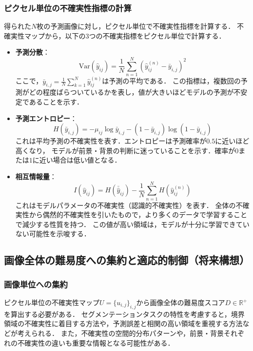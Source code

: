 \documentclass[10pt, a4paper, twocolumn]{jarticle}
\begin{document}
\subsubsection{ピクセル単位の不確実性指標の計算}
得られた$N$枚の予測画像に対し，ピクセル単位で不確実性指標を計算する．
不確実性マップから，以下の3つの不確実指標をピクセル単位で計算する．

\begin{itemize}
  \item \textbf{予測分散}：
  \begin{equation}
    \text{Var}(\hat{y}_{ij}) = \frac{1}{N} \sum_{n=1}^{N} (\hat{y}_{ij}^{(n)} - \bar{y}_{i,j})^2
  \end{equation}
  ここで，$\bar{y}_{i,j} = \frac{1}{N} \sum_{k = 1}^{N} \hat{y}_{ij} ^ {(n)}$は予測の平均である．
  この指標は，複数回の予測がどの程度ばらついているかを表し，値が大きいほどモデルの予測が不安定であることを示す．
  \item \textbf{予測エントロピー}：
  \begin{equation}
    H(\bar{y}_{i,j}) = - \mu_{ij} \log{\bar{y}_{i,j}} - (1 - \bar{y}_{i,j}) \log{(1 - \bar{y}_{i,j})}
  \end{equation}
  これは平均予測の不確実性を表す．エントロピーは予測確率が$0.5$に近いほど高くなり，
  モデルが前景・背景の判断に迷っていることを示す．確率が$0$または$1$に近い場合は低い値となる．
  \item \textbf{相互情報量}：
  \begin{equation}
    I(\hat{y}_{ij}) = H(\bar{\hat{y}}_{ij}) - \frac{1}{N}\sum_{n=1}^{N} H(\hat{y}_{ij}^{(n)})
  \end{equation}
  これはモデルパラメータの不確実性（認識的不確実性）を表す．
  全体の不確実性から偶然的不確実性を引いたもので，より多くのデータで学習することで減少する性質を持つ．
  この値が高い領域は，モデルが十分に学習できていない可能性を示唆する．
\end{itemize}

\subsection{画像全体の難易度への集約と適応的制御（将来構想）}

\subsubsection{画像単位への集約}
ピクセル単位の不確実性マップ$U = \{u_{i,j}\}_{i,j}$から画像全体の難易度スコア$D \in \mathbb{R}^+$を算出する必要がある．
セグメンテーションタスクの特性を考慮すると，境界領域の不確実性に着目する方法や，予測誤差と相関の高い領域を重視する方法などが考えられる．
また，不確実性の空間的分布パターンや，前景・背景それぞれの不確実性の違いも重要な情報となる可能性がある．
\end{document}
